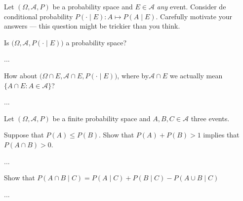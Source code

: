 \documentclass[a4paper,10pt,landscape,twocolumn]{scrartcl}
\begin{document}

\begin{exercise}[]
  Let $(\Omega, \mathcal{A}, P)$ be a probability space and $E\in \mathcal{A}$
  \emph{any} event. Consider de conditional probability $P( \cdot \mid E): A
  \mapsto P(A\mid E)$. Carefully motivate your answers --- this question might
  be trickier than you think.
  
  \begin{subex}
    Is $\bigl(\Omega, \mathcal A, P(\cdot \mid E)\bigr)$ a probability space?	
  \end{subex}
  
  \begin{solution}
    ...  
  \end{solution}
  
  
  \begin{subex}
    How about $\bigl(\Omega\cap E, \mathcal A\cap E, P(\cdot \mid E)\bigr)$,
    where by$\mathcal A \cap E$ we actually mean 
    $\{ A\cap E: A \in \mathcal A\}$?
  \end{subex}
  
  \begin{solution}
    ...  
  \end{solution}
  
\end{exercise}


\begin{exercise}[]
  Let $(\Omega, \mathcal{A}, P)$ be a finite probability space and 
  $A, B, C \in \mathcal A$ three events.
  
  \begin{subex}
    Suppose that $P(A) \le P(B)$. Show that $P(A) + P(B) > 1$ implies that
    $P(A\cap B) > 0$.
  \end{subex}
  
  \begin{solution}
    ...  
  \end{solution}
  
	
  \begin{subex}
    Show that $P(A \cap B \mid C) = {P}(A\mid C) + {P}(B\mid C) - {P}(A \cup B
    \mid C)$ 
  \end{subex}
  
  \begin{solution}
    ...  
  \end{solution}
  
\end{exercise}
\end{document}
